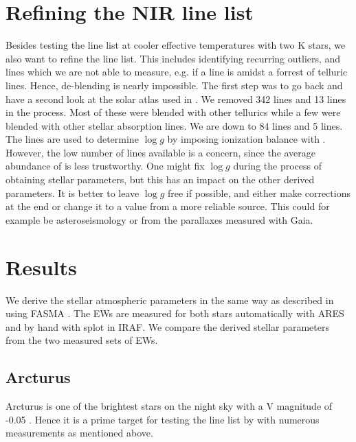 \documentclass{aa}
\begin{document}
\section{Refining the NIR line list}
\label{sec:refining_the_line_list}

Besides testing the line list at cooler effective temperatures with two K stars,
we also want to refine the line list. This includes identifying recurring
outliers, and lines which we are not able to measure, e.g. if a line is amidst a
forrest of telluric lines. Hence, de-blending is nearly impossible. The first
step was to go back and have a second look at the solar atlas used in
\citet{Andreasen2016}. We removed 342  lines and 13 
lines in the process. Most of these were blended with other tellurics while a
few were blended with other stellar absorption lines. We are down to 84
 lines and 5  lines. The  lines are used to
determine $\log g$ by imposing ionization balance with . However, the
low number of  lines available is a concern, since the average
abundance of  is less trustworthy. One might fix $\log g$ during the
process of obtaining stellar parameters, but this has an impact on the other
derived parameters. It is better to leave $\log g$ free if possible, and either
make corrections at the end or change it to a value from a more reliable source.
This could for example be asteroseismology or from the parallaxes measured with
Gaia.


\section{Results}
\label{sec:results}

We derive the stellar atmospheric parameters in the same way as described in
\citet{Andreasen2016} using FASMA \citep{Andreasen2017a}. The EWs are measured
for both stars automatically with ARES \citep{Sousa2015a} and by hand with splot
in IRAF. We compare the derived stellar parameters from the two measured sets of
EWs.


\subsection{Arcturus}
\label{sec:arcturus}

Arcturus is one of the brightest stars on the night sky with a V magnitude of
-0.05 \citep{Ducati2002}. Hence it is a prime target for testing the line list
by \cite{Andreasen2016} with numerous measurements as mentioned above.
\end{document}
